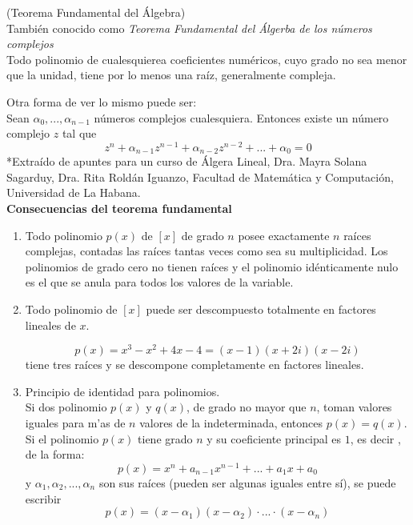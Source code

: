 \documentclass[10pt,twoside]{SelfArx} %
\begin{document}
\begin{teorema}
	(Teorema Fundamental del Álgebra)\\
	También conocido como \textsl{Teorema Fundamental del Álgerba de los números complejos}\\
	Todo polinomio de cualesquierea coeficientes numéricos, cuyo grado no sea menor que la unidad, tiene por lo menos una raíz, generalmente compleja.
	
\end{teorema}
Otra forma de ver lo mismo puede ser:\\
Sean $ \alpha_{0}, ...,\alpha_{n-1} $ números complejos cualesquiera. Entonces existe un número complejo $ z $ tal que
\begin{equation}
z^{n}+\alpha_{n-1} z^{n-1}+\alpha_{n-2}z^{n-2}+...+\alpha_{0}=0
\end{equation}
*Extraído de apuntes para un curso de Álgera Lineal, Dra. Mayra Solana Sagarduy, Dra. Rita Roldán Iguanzo, Facultad de Matemática y Computación, Universidad de La Habana. 
\\
\textbf{Consecuencias del teorema fundamental}\\
\begin{enumerate}
	\item Todo polinomio $ p(x) $ de $ [x] $ de grado $ n $ posee exactamente $ n $ raíces complejas, contadas las raíces tantas veces como sea su multiplicidad. Los polinomios de grado cero no tienen raíces y el polinomio idénticamente nulo es el que se anula para todos los valores de la variable.
	\item Todo polinomio de $ [x] $ puede ser descompuesto totalmente en factores lineales de $ x $.\\
	\begin{ejemplo}
		\[ p(x)=x^{3}-x^{2}+4x-4=(x-1)(x+2i)(x-2i) \]
		tiene tres raíces y se descompone completamente en factores lineales.
	\end{ejemplo}
	\item Principio de identidad para polinomios.\\
	Si dos polinomio $ p(x) $ y $ q(x) $, de grado no mayor que $ n $, toman valores iguales para m'as de $ n $ valores de la indeterminada, \textsf{entonces} $ p(x)=q(x) $.\\
	Si el polinomio $ p(x) $ tiene grado $ n $ y su coeficiente principal es $ 1 $, es decir , de la forma:
	\[ p(x)=x^{n}+a_{n-1}x^{n-1}+...+a_{1}x+a_{0} \]
	y $ \alpha_{1}, \alpha_{2}, ..., \alpha_{n} $ son sus raíces (pueden ser algunas iguales entre sí), se puede escribir
	\begin{equation}
	p(x)=(x-\alpha_{1})(x-\alpha_{2})\cdot...\cdot(x-\alpha_{n})
	\end{equation}
\end{enumerate}
\end{document}
